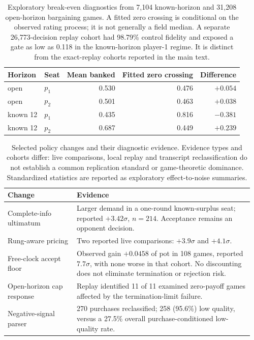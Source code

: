 \documentclass{article}
\begin{document}
\begin{table}[H]
\centering\small
\caption{Exploratory break-even diagnostics from 7,104 known-horizon and
31,208 open-horizon bargaining games. A fitted zero crossing is conditional on
the observed rating process; it is not generally a field median. A separate
26,773-decision replay cohort had 98.79\% control fidelity and exposed a gate
as low as 0.118 in the known-horizon player-1 regime. It is distinct from the
exact-replay cohorts reported in the main text.}
\label{tab:breakeven}
\begin{tabular}{@{}llrrr@{}}
\toprule
Horizon & Seat & Mean banked & Fitted zero crossing & Difference\\
\midrule
open & $p_1$ & 0.530 & 0.476 & $+0.054$\\
open & $p_2$ & 0.501 & 0.463 & $+0.038$\\
known 12 & $p_1$ & 0.435 & 0.816 & $-0.381$\\
known 12 & $p_2$ & 0.687 & 0.449 & $+0.239$\\
\bottomrule
\end{tabular}
\end{table}

\begin{table}[H]
\centering\small
\caption{Selected policy changes and their diagnostic evidence. Evidence
types and cohorts differ: live comparisons, local replay and transcript
reclassification do not establish a common replication standard or
game-theoretic dominance. Standardized statistics are reported as exploratory
effect-to-noise summaries.}
\label{tab:ledger}
\begin{tabular}{@{}p{0.27\linewidth}p{0.69\linewidth}@{}}
\toprule
Change & Evidence\\
\midrule
Complete-info ultimatum & Larger demand in a one-round known-surplus seat;
reported $+3.42\sigma$, $n=214$. Acceptance remains an opponent decision.\\
Rung-aware pricing & Two reported live comparisons: $+3.9\sigma$ and
$+4.1\sigma$.\\
Free-clock accept floor & Observed gain $+0.0458$ of pot in 108 games,
reported $7.7\sigma$, with none worse in that cohort. No discounting does not
eliminate termination or rejection risk.\\
Open-horizon cap response & Replay identified 11 of 11 examined zero-payoff
games affected by the termination-limit failure.\\
Negative-signal parser & 270 purchases reclassified; 258 (95.6\%) low quality,
versus a 27.5\% overall purchase-conditioned low-quality rate.\\
\bottomrule
\end{tabular}
\end{table}
\end{document}
